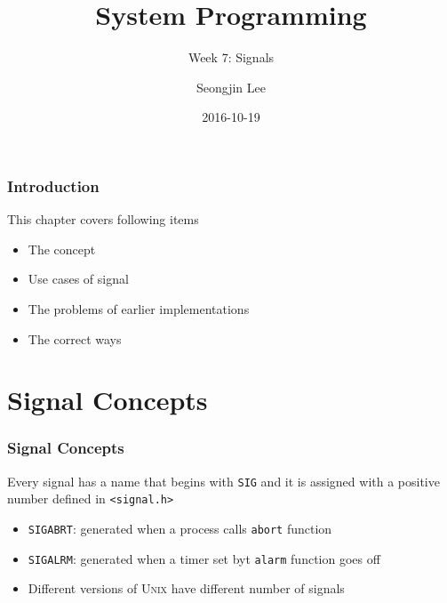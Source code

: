\documentclass[newPxFont,sthlmFooter,nooffset]{beamer}
\title{System Programming}
\subtitle{Week 7: Signals}
\author[SJL]{Seongjin Lee}
\institute{\href{mailto:insight@hanyang.ac.kr}{insight@hanyang.ac.kr}\\\url{http://esos.hanyang.ac.kr}\\Esos Lab. Hanyang University}
\date{2016-10-19}
\begin{document}
\frame[plain]{\titlepage} 






\begin{frame}[t]
  \frametitle{Introduction}
This chapter covers following items
  \begin{itemize}
  \item The concept
  \item Use cases of signal
  \item The problems of earlier implementations
  \item The correct ways
  \end{itemize}

\end{frame}

\section{Signal Concepts}



\begin{frame}[t]
  \frametitle{Signal Concepts}

Every signal has a name that begins with \texttt{SIG} and it is assigned with a positive number defined in \texttt{<signal.h>}
\begin{itemize}
\item \texttt{SIGABRT}: generated when a process calls \texttt{abort} function
\item \texttt{SIGALRM}: generated when a timer set byt \texttt{alarm} function goes off
\item Different versions of \textsc{Unix} have different number of signals
\end{itemize}
\end{frame}
\end{document}

